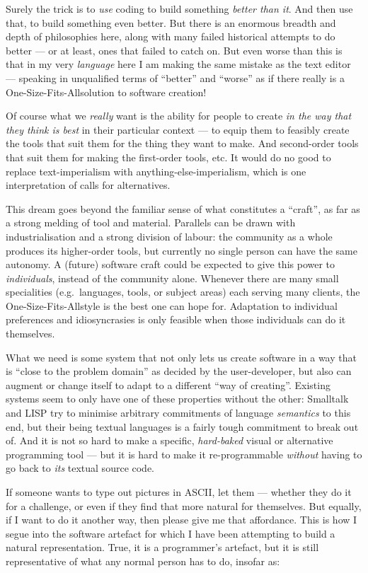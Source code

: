 Surely the trick is to \emph{use} coding to build something \emph{better
than it}. And then use that, to build something even better. But there
is an enormous breadth and depth of philosophies here, along with many
failed historical attempts to do better --- or at least, ones that
failed to catch on. But even worse than this is that in my very
\emph{language} here I am making the same mistake as the text editor ---
speaking in unqualified terms of ``better'' and ``worse'' as if there
really is a One-Size-Fits-Allsolution to software creation!

Of course what we \emph{really} want is the ability for people to create
\emph{in the way that they think is best} in their particular context
--- to equip them to feasibly create the tools that suit them for the
thing they want to make. And second-order tools that suit them for
making the first-order tools, etc. It would do no good to replace
text-imperialism with anything-else-imperialism, which is one
interpretation of calls for alternatives.

This dream goes beyond the familiar sense of what constitutes a
``craft'', as far as a strong melding of tool and material. Parallels
can be drawn with industrialisation and a strong division of labour: the
community as a whole produces its higher-order tools, but currently no
single person can have the same autonomy. A (future) software craft
could be expected to give this power to \emph{individuals}, instead of
the community alone. Whenever there are many small specialities
(e.g.~languages, tools, or subject areas) each serving many clients, the
One-Size-Fits-Allstyle is the best one can hope for. Adaptation to
individual preferences and idiosyncrasies is only feasible when those
individuals can do it themselves.

What we need is some system that not only lets us create software in a
way that is ``close to the problem domain'' as decided by the
user-developer, but also can augment or change itself to adapt to a
different ``way of creating''. Existing systems seem to only have one of
these properties without the other: Smalltalk and LISP try to minimise
arbitrary commitments of language \emph{semantics} to this end, but
their being textual languages is a fairly tough commitment to break out
of. And it is not so hard to make a specific, \emph{hard-baked} visual
or alternative programming tool --- but it is hard to make it
re-programmable \emph{without} having to go back to \emph{its} textual
source code.

If someone wants to type out pictures in ASCII, let them --- whether
they do it for a challenge, or even if they find that more natural for
themselves. But equally, if I want to do it another way, then please
give me that affordance. This is how I segue into the software artefact
for which I have been attempting to build a natural representation.
True, it is a programmer's artefact, but it is still representative of
what any normal person has to do, insofar as:

